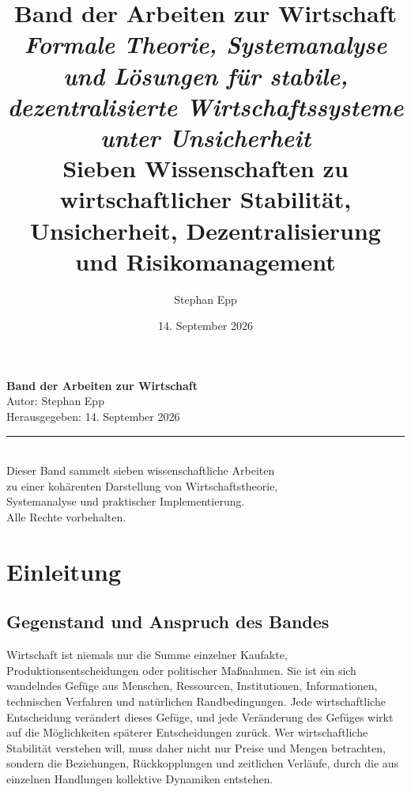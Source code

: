 \documentclass[a4paper, 12pt, twoside, openright]{report}
\title{
  \vspace*{2cm}
  {\Huge\bfseries Band der Arbeiten zur Wirtschaft}\\
  \vspace{1.5cm}
  {\Large\itshape Formale Theorie, Systemanalyse und Lösungen
für stabile, dezentralisierte Wirtschaftssysteme unter Unsicherheit}\\
  \vspace{2cm}
  {\large Sieben Wissenschaften zu wirtschaftlicher Stabilität,\\
  Unsicherheit, Dezentralisierung und Risikomanagement}
}
\author{
  \vspace{2cm}
  {\Large Stephan Epp}\\
}
\date{
  \vspace{1cm}
  {\large 14. September 2026}
}
\theoremstyle{definition}
\theoremstyle{definition}
\begin{document}
\maketitle

\thispagestyle{empty}
\cleardoublepage

\thispagestyle{empty}
\mbox{}
\vfill
\begin{center}
  \small
  \textbf{Band der Arbeiten zur Wirtschaft}\\
  \medskip
  Autor: Stephan Epp\\
  Herausgegeben: 14. September 2026\\
  \medskip
  \rule{0.3\textwidth}{0.5pt}\\
  \medskip
  Dieser Band sammelt sieben wissenschaftliche Arbeiten\\
  zu einer kohärenten Darstellung von Wirtschaftstheorie,\\
  Systemanalyse und praktischer Implementierung.\\
  \vspace{1cm}
  Alle Rechte vorbehalten.
\end{center}
\cleardoublepage

\tableofcontents
\cleardoublepage

\listoffigures
\cleardoublepage

\listoftables
\cleardoublepage

\chapter{Einleitung}
\label{ch:introduction}

\section{Gegenstand und Anspruch des Bandes}

Wirtschaft ist niemals nur die Summe einzelner Kaufakte, Produktionsentscheidungen
oder politischer Maßnahmen. Sie ist ein sich wandelndes Gefüge aus Menschen,
Ressourcen, Institutionen, Informationen, technischen Verfahren und natürlichen
Randbedingungen. Jede wirtschaftliche Entscheidung verändert dieses Gefüge, und
jede Veränderung des Gefüges wirkt auf die Möglichkeiten späterer Entscheidungen
zurück. Wer wirtschaftliche Stabilität verstehen will, muss daher nicht nur Preise
und Mengen betrachten, sondern die Beziehungen, Rückkopplungen und zeitlichen
Verläufe, durch die aus einzelnen Handlungen kollektive Dynamiken entstehen.
\end{document}

